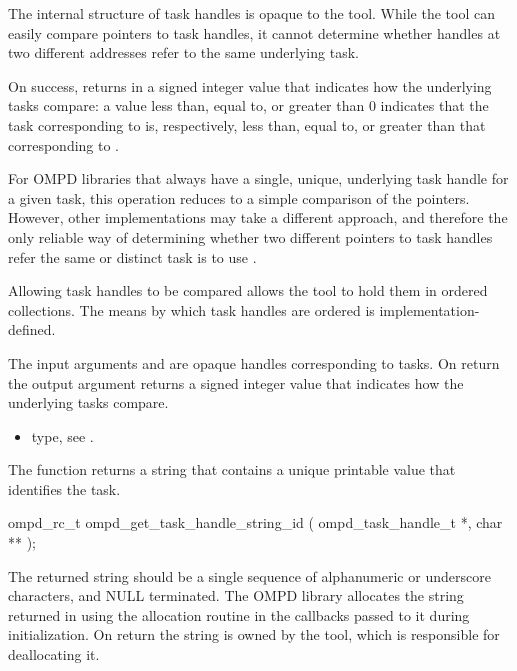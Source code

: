 \descr
The internal structure of task handles is opaque to the tool. While the tool can easily compare 
pointers to task handles, it cannot determine whether handles at two different addresses refer
to the same underlying task.

On success,  returns in  a signed integer 
value that indicates how the underlying tasks compare: a value less than, equal to, or greater than 
0 indicates that the task corresponding to  is, respectively, less than, equal 
to, or greater than that corresponding to .

For OMPD libraries that always have a single, unique, underlying task handle for a given 
task, this operation reduces to a simple comparison of the pointers. However, other 
implementations may take a different approach, and therefore the only reliable way of determining 
whether two different pointers to task handles refer the same or distinct task is to use 
.

Allowing task handles to be compared allows the tool to hold them in ordered collections.
The means by which task handles are ordered is implementation-defined.

\argdesc
The input arguments  and  are opaque handles 
corresponding to tasks.
On return the output argument   returns a signed 
integer value that indicates how the underlying tasks compare.

\crossreferences
\begin{itemize}
	\item {} type, see .
\end{itemize}

\label{ompd:ompd_get_task_handle_string_id}
\summary
The  function returns a string that contains a unique 
printable value that identifies the task.

\format

\begin{cspecific}
\begin{ompSyntax}
ompd_rc_t ompd_get_task_handle_string_id (
  ompd_task_handle_t *,
  char **
);
\end{ompSyntax}
\end{cspecific}


\descr
The returned string should be a single sequence of alphanumeric or underscore characters, and 
NULL terminated. The OMPD library allocates the string returned in 
using the allocation routine in the callbacks passed to it during initialization. On return the string is 
owned by the tool, which is responsible for deallocating it.

